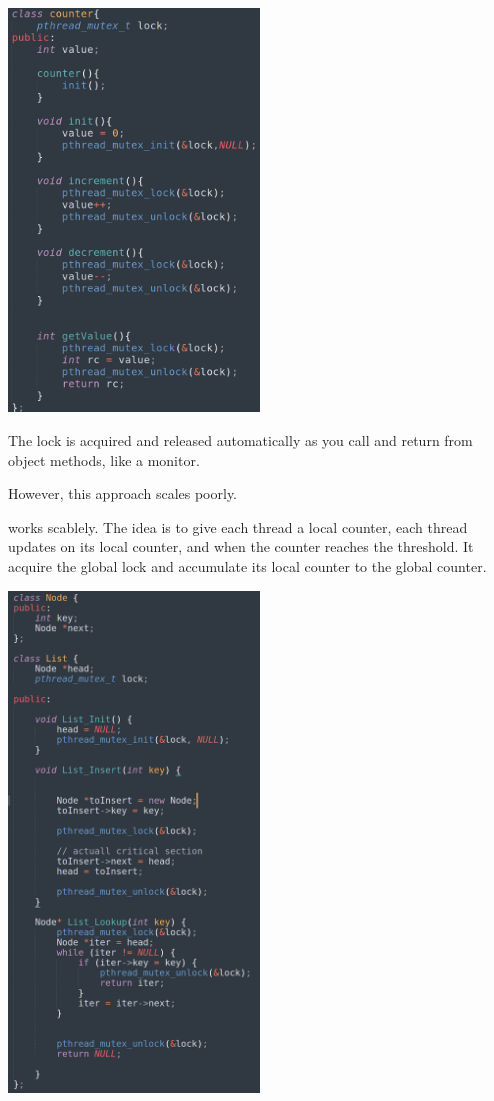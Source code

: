
    \includegraphics[width=0.5\textwidth]{chapters/Cucurrency/Cucurrency/current_counter.png}

    The lock is acquired and released automatically as you call and return from object methods, like
    a monitor.

    However, this approach scales poorly.

     works scablely. The idea is to give each thread a local counter, each thread 
    updates on its local counter, and when the counter reaches the threshold. It acquire the global lock 
    and accumulate its local counter to the global counter.


    \includegraphics[width=0.5\textwidth]{chapters/Cucurrency/Cucurrency/cucurrent_linkedlist.png}

